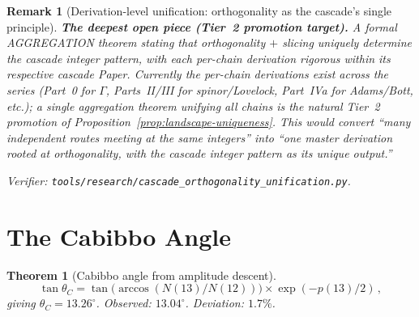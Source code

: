 \documentclass[12pt,a4paper]{article}
\newtheorem{theorem}{Theorem}[section]
\newtheorem*{remark}{Remark}
\begin{document}
\begin{remark}[Derivation-level unification: orthogonality as the cascade's single principle]
\medskip\noindent\textbf{The deepest open piece (Tier~2 promotion target).} A formal AGGREGATION theorem stating that orthogonality $+$ slicing uniquely determine the cascade integer pattern, with each per-chain derivation rigorous within its respective cascade Paper. Currently the per-chain derivations exist across the series (Part~0 for $\Gamma$, Parts~II/III for spinor/Lovelock, Part~IVa for Adams/Bott, etc.); a single aggregation theorem unifying all chains is the natural Tier~2 promotion of Proposition~\ref{prop:landscape-uniqueness}. This would convert ``many independent routes meeting at the same integers'' into ``one master derivation rooted at orthogonality, with the cascade integer pattern as its unique output.''

Verifier: \texttt{tools/research/cascade\_orthogonality\_unification.py}.
\end{remark}


\section{The Cabibbo Angle}\label{sec:cabibbo}

\begin{theorem}[Cabibbo angle from amplitude descent]\label{thm:cabibbo-amplitude}
\begin{equation}
\tan\theta_C = \tan\!\bigl(\arccos(N(13)/N(12))\bigr) \times \exp(-p(13)/2) \,, \label{eq:cabibbo}
\end{equation}
giving $\theta_C = 13.26^\circ$. Observed: $13.04^\circ$. Deviation: $1.7\%$.
\end{theorem}
\end{document}
